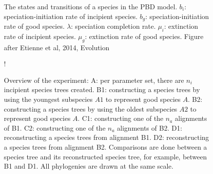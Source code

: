 \documentclass{article}
\begin{document}
\begin{figure}
  \centering

  \caption{
    The states and transitions of a species in the PBD model.
    $b_i$: speciation-initiation rate of incipient species. 
    $b_g$: speciation-initiation rate of good species. 
    $\lambda$: speciation completion rate. 
    $\mu_i$: extinction rate of incipient species. 
    $\mu_g$: extinction rate of good species. 
    Figure after Etienne et al, 2014, Evolution
  }
  \label{fig:pbd_states}
\end{figure}

\begin{figure}
  \centering 
  \resizebox {0.8\textwidth} {!} {
    \CreateTikzFigureExperiment{} 
  }
  \caption{
    Overview of the experiment: 
    A: per parameter set, there are $n_i$ incipient species trees created. 
    B1: constructing a species trees by using the youngest subspecies $A1$ to represent good species $A$.
    B2: constructing a species trees by using the oldest subspecies $A2$ to represent good species $A$.
    C1: constructing one of the $n_a$ alignments of B1. 
    C2: constructing one of the $n_a$ alignments of B2. 
    D1: reconstructing a species trees from alignment B1.
    D2: reconstructing a species trees from alignment B2.
    Comparisons are done between a species tree and its reconstructed species tree, 
    for example, between B1 and D1.
    All phylogenies are drawn at the same scale.
  }
  \label{fig:experiment}
\end{figure}
\end{document}
